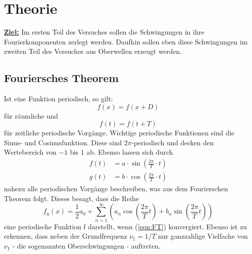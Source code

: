 \section{Theorie \cite{sample}}

\textbf{\underline{Ziel:}}
Im ersten Teil des Versuches sollen die Schwingungen in ihre Fourierkomponenten zerlegt werden.
Daufhin sollen eben diese Schwingungen im zweiten Teil des Versuches aus Oberwellen erzeugt werden.

\subsection{Fouriersches Theorem}

Ist eine Funktion periodisch, so gilt:
\begin{equation}
  f(x)=f(x+D)
\end{equation}
für räumliche  und
\begin{equation}
  f(t)=f(t+T)
\end{equation}
für zeitliche periodische Vorgänge.
Wichtige periodische Funktionen sind die Sinus- und Cosinusfunktion.
Diese sind $2\pi$-periodisch und decken den Wertebereich von $-1$ bis $1$ ab.
Ebenso lassen sich durch
\begin{align}
  f(t) &=a \cdot \sin{(\frac{2\pi}{T}\cdot t)}  \\
  g(t) &=b \cdot \cos{(\frac{2\pi}{T}\cdot t)}
\end{align}
nahezu alle periodischen Vorgänge beschreiben, was aus dem Fourierschen Theorem folgt.
Dieses besagt, dass die Reihe
\begin{equation}
  f_\text{n}(x) = \frac{1}{2}a_0 + \sum_{n=1}^{\infty}\left(a_n \cos{(\frac{2\pi}{T}t)} + b_n \sin{(\frac{2\pi}{T}t)} \right)
  \label{eqn:FT}
\end{equation}
eine periodische Funktion f darstellt, wenn (\ref{eqn:FT}) konvergiert.
Ebenso ist zu erkennen, dass neben der Grundfrequenz $\nu_1 = 1/T$ nur ganzzahlige Vielfache
von $\nu_1$ - die sogenannten Oberschwingungen - auftreten.

